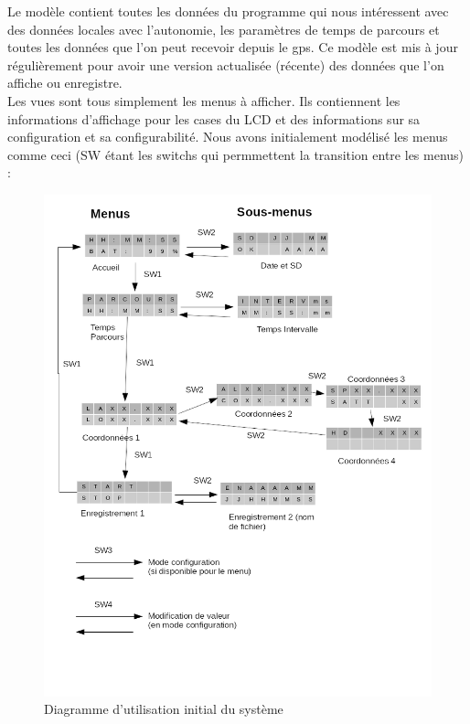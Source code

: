 \documentclass{report}
\begin{document}
Le modèle contient toutes les données du programme qui nous intéressent
avec des données locales avec l'autonomie, les paramètres de temps de parcours
 et toutes les données que l'on peut recevoir depuis le gps. Ce modèle
 est mis à jour régulièrement pour avoir une version actualisée
 (récente) des données que l'on affiche ou enregistre. \\
 
Les vues sont tous simplement les menus à afficher. Ils contiennent
les informations d'affichage pour les cases du LCD et des informations
sur sa configuration et sa configurabilité. Nous avons initialement 
modélisé les menus comme ceci (SW étant les switchs qui permmettent
la transition entre les menus) :

\begin{figure}[H]
	\begin{center}
		\includegraphics[scale=0.5]{diagrammeCasUtilisation1.png}
	\end{center}
	\caption{Diagramme d'utilisation initial du système}
\end{figure}
\end{document}
